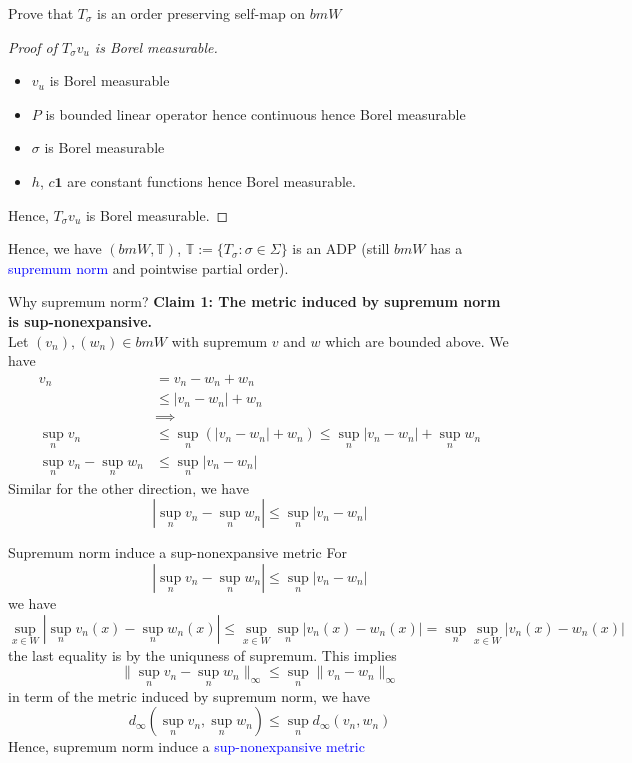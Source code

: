 \documentclass[aspectratio=169]{beamer} %
\begin{document}
\begin{frame}{Prove that $T_\sigma$ is an order preserving self-map on $bmW$}
    \begin{proof}[Proof of $T_\sigma v_u$ is Borel measurable]
        \begin{itemize}
            \item $v_u$ is Borel measurable
            \item $P$ is bounded linear operator hence continuous hence Borel measurable
            \item $\sigma$ is Borel measurable
            \item $h$, $c\mathbf{1}$ are constant functions hence Borel measurable.
        \end{itemize}
        Hence, $T_\sigma v_u$ is Borel measurable.
    \end{proof}
    Hence, we have $(bmW, \mathbb{T})$, $\mathbb{T}:=\{T_\sigma: \sigma\in\Sigma\}$ is an ADP (still $bmW$ has a \textcolor{blue}{supremum norm} and pointwise partial order).
\end{frame}
\begin{frame}{Why supremum norm?}
\textbf{Claim 1: The metric induced by supremum norm is sup-nonexpansive.}\\
Let $(v_n), (w_n)\in bmW$ with supremum $v$ and $w$ which are bounded above. We have
\begin{align*}
    v_n &= v_n-w_n+w_n\\
    &\le |v_n-w_n|+w_n\\
    &\implies\\
    \sup_n v_n&\le \sup_n(|v_n-w_n|+w_n)\le \sup_n|v_n-w_n|+\sup_n w_n\\
    \sup_n v_n - \sup_nw_n&\le \sup_n|v_n-w_n|
\end{align*}
Similar for the other direction, we have
$$
|\sup_n v_n-\sup_nw_n|\le \sup_n|v_n-w_n|
$$
    
\end{frame}
\begin{frame}{Supremum norm induce a sup-nonexpansive metric}
For 
$$
|\sup_n v_n-\sup_nw_n|\le \sup_n|v_n-w_n|
$$
we have
$$
\sup_{x\in W} |\sup_n v_n(x)-\sup_nw_n(x)|\le \sup_{x\in W} \sup_n|v_n(x)-w_n(x)|= \sup_n\sup_{x\in W}|v_n(x)-w_n(x)|
$$
the last equality is by the uniquness of supremum. This implies
$$
\|\sup_n v_n - \sup_n w_n\|_\infty \le \sup_n\|v_n-w_n\|_\infty
$$
in term of the metric induced by supremum norm, we have
$$
d_\infty(\sup_n v_n, \sup_n w_n)\le \sup_n d_\infty(v_n,w_n)
$$
Hence, supremum norm induce a \textcolor{blue}{sup-nonexpansive metric}
    
\end{frame}
\end{document}
